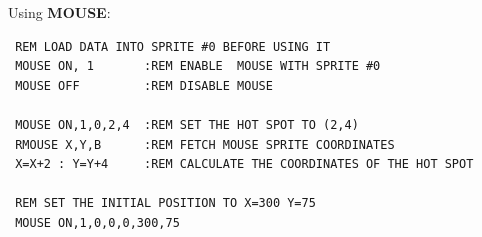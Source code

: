 \begin{description}[leftmargin=2cm,style=nextline]
\item [Examples:] Using {\bf MOUSE}:
\begin{tcolorbox}[colback=black,coltext=white]
\verbatimfont{\codefont}
\begin{verbatim}
 REM LOAD DATA INTO SPRITE #0 BEFORE USING IT
 MOUSE ON, 1       :REM ENABLE  MOUSE WITH SPRITE #0
 MOUSE OFF         :REM DISABLE MOUSE

 MOUSE ON,1,0,2,4  :REM SET THE HOT SPOT TO (2,4)
 RMOUSE X,Y,B      :REM FETCH MOUSE SPRITE COORDINATES
 X=X+2 : Y=Y+4     :REM CALCULATE THE COORDINATES OF THE HOT SPOT

 REM SET THE INITIAL POSITION TO X=300 Y=75
 MOUSE ON,1,0,0,0,300,75
\end{verbatim}
\end{tcolorbox}
\end{description}


\newpage
